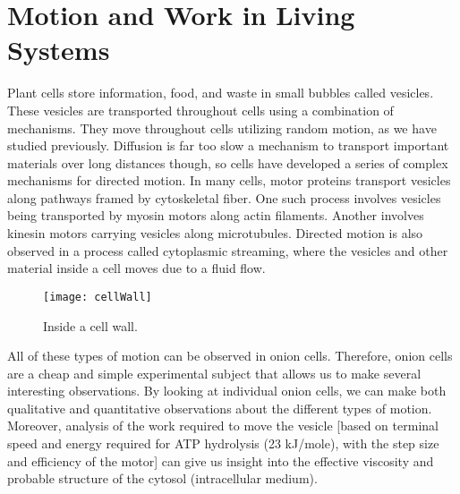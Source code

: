 \chapter{Motion and Work in Living Systems}
\thispagestyle{fancy}
%
Plant cells store information, food, and waste in small bubbles called vesicles.
These vesicles are transported throughout cells using a combination of mechanisms.
They move throughout cells utilizing random motion, as we have studied previously.
Diffusion is far too slow a mechanism to transport important materials over long distances though, so cells have developed a series of complex mechanisms for directed motion.
In many cells, motor proteins transport vesicles along pathways framed by cytoskeletal fiber.
One such process involves vesicles being transported by myosin motors along actin filaments.
Another involves kinesin motors carrying vesicles along microtubules.
Directed motion is also observed in a process called cytoplasmic streaming, where the vesicles and other material inside a cell moves due to a fluid flow.

\begin{wrapfigure}{r}{0.5\textwidth}
  \vspace{-20pt}  
  \begin{center}
    \texttt{[image: cellWall]}
  \end{center}
  \caption{Inside a cell wall.}
  \label{fig:cell-wall}
  \vspace{-20pt}
\end{wrapfigure}

All of these types of motion can be observed in onion cells.
Therefore, onion cells are a cheap and simple experimental subject that allows us to make several interesting observations.
By looking at individual onion cells, we can make both qualitative and quantitative observations about the different types of motion.
Moreover, analysis of the work required to move the vesicle [based on terminal speed and energy required for ATP hydrolysis (23 kJ/mole), with the step size and efficiency of the motor] can give us insight into the effective viscosity and probable structure of the cytosol (intracellular medium).

